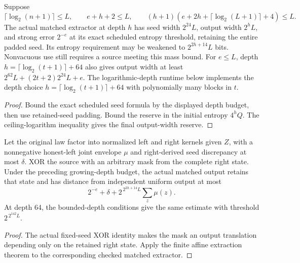 \begin{theorem}
  \label{thm:lowerbounds-algebraic-matched-growing}
  \leanok
  Suppose
  \[
    \lceil\log_2(n+1)\rceil\le L,\qquad e+h+2\le L,\qquad
    (h+1)(e+2h+\lceil\log_2(L+1)\rceil+4)\le L.
  \]
  The actual matched extractor at depth $h$ has seed width $2^{24}L$,
  output width $2^hL$, and strong error $2^{-e}$ at its exact scheduled
  entropy threshold, retaining the entire padded seed. Its entropy
  requirement may be weakened to $2^{2h+14}L$ bits. Nonvacuous use still
  requires a source meeting this mass bound. For $e\le L$, depth
  $h=\lceil\log_2(t+1)\rceil+64$ also gives output width at least
  $2^{62}L+(2t+2)2^{24}L+e$.
  The logarithmic-depth runtime below implements the depth choice
  $h=\lceil\log_2(t+1)\rceil+64$ with polynomially many blocks in $t$.
\end{theorem}
\begin{proof}
  \leanok
  Bound the exact scheduled seed formula by the displayed depth budget,
  then use retained-seed padding. Bound the reserve in the initial
  entropy $4^hQ$. The ceiling-logarithm inequality gives the final
  output-width reserve.
\end{proof}

\begin{theorem}
  \label{thm:lowerbounds-algebraic-matched-affine}
  \leanok
  Let the original law factor into normalized left and right kernels
  given $Z$, with a nonnegative honest-left joint envelope $\mu$ and
  right-derived seed discrepancy at most $\delta$. XOR the source with
  an arbitrary mask from the complete right state. Under the preceding
  growing-depth budget, the actual matched output retains that state
  and has distance from independent uniform output at most
  \[
    2^{-e}+\delta+2^{\,2^{2h+14}L}\sum_z\mu(z).
  \]
  At depth 64, the bounded-depth conditions give the same estimate
  with threshold $2^{\,2^{142}L}$.
\end{theorem}
\begin{proof}
  \leanok
  The actual fixed-seed XOR identity makes the mask an output translation
  depending only on the retained right state. Apply the finite affine
  extraction theorem to the corresponding checked matched extractor.
\end{proof}

